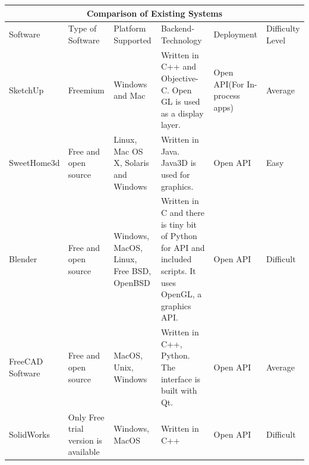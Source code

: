 \documentclass{article}
\begin{document}
\begin{tabular}{|p{2cm}|p{2cm}|p{2cm}|p{4cm}|p{2cm}|p{2cm}|  }
\hline
\multicolumn{6}{|c|}{Comparison of Existing Systems} \\
\hline
Software&Type of Software&Platform Supported	&Backend-Technology	&Deployment	&Difficulty Level\\
\hline
SketchUp&Freemium&Windows and Mac&Written in C++ and Objective-C. Open GL is used as a display layer.&Open API(For In-process apps)&Average\\
\hline
SweetHome3d&Free and open source&Linux, Mac OS X, Solaris and Windows&Written in Java. Java3D is used for graphics.&Open API&Easy\\
\hline
Blender&Free and open source&Windows, MacOS, Linux, Free BSD, OpenBSD&Written in C and there is tiny bit of Python for API and included scripts. It uses OpenGL, a graphics API.	&Open API&Difficult\\
\hline
FreeCAD Software&Free and open source& MacOS, Unix, Windows&Written in C++, Python. The interface is built with Qt. &Open API&Average\\
\hline
SolidWorks&Only Free trial version is available&Windows, MacOS&Written in C++	&Open API&Difficult\\
\hline
\end{tabular}
\end{document}
